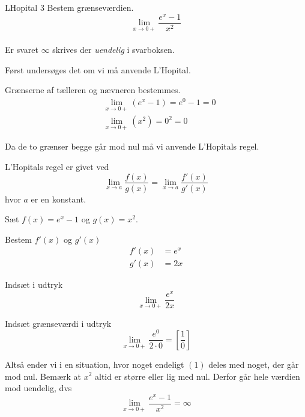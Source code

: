 \documentclass{article}
\begin{document}
\begin{exercise}{LHopital 3}
	Bestem grænseværdien.
	\[
	\lim_{x \to 0+} \frac{e^x - 1}{x^2}
	\] 
	\\
	Er svaret $\infty$ skrives der \emph{uendelig} i svarboksen.
	
	
	\hint
	Først undersøges det om vi må anvende L'Hopital.
	
	\hint
	Grænserne af tælleren og nævneren bestemmes.
	\begin{align*}
		&\lim_{x \to 0+} (e^x - 1) = e^0 - 1 = 0 \\
		&\lim_{x \to 0+} (x^2) = 0^2  = 0
	\end{align*}
	
	\hint
	Da de to grænser begge går mod nul må vi  anvende L'Hopitals regel. 
	
	\hint
	L'Hopitals regel er givet ved
	\[
	\lim_{x \to a} \frac{f(x)}{g(x)} = \lim_{x \to a} \frac{f'(x)}{g'(x)} 
	\]
	hvor $a$ er en konstant.
	
	\hint
	Sæt $f(x) = e^x - 1$ og $g(x) = x^2$. 
	
	\hint
	Bestem $f'(x)$ og $g'(x)$
	\begin{align*}
		f'(x) &= e^x \\
		g'(x) &= 2x
	\end{align*}
	
	\hint
	Indsæt i udtryk 
	\[
	\lim_{x \to 0+} \frac{e^x}{2x} 
	\]
	
	\hint
	Indsæt grænseværdi i udtryk
	\[
	\lim_{x \to 0+} \frac{e^0}{2 \cdot 0}  = \left[ \frac{1}{0}  \right] 
	\]
	
	\hint
	Altså ender vi i en situation, hvor noget endeligt $(1)$ deles med noget, der går mod nul. Bemærk at $x^2$ altid er større eller lig med nul. Derfor går hele værdien mod uendelig, dvs
 	\[
	\lim_{x \to 0+} \frac{e^x-1}{x^2} = \infty
	\]
\end{exercise}
\end{document}
